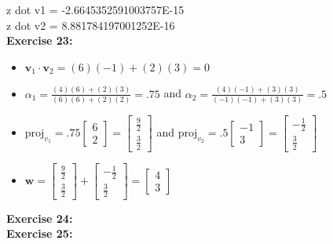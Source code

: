 \documentclass[10pt]{article}
\begin{document}
	z dot v1 = -2.6645352591003757E-15\\
	z dot v2 = 8.881784197001252E-16
	\\
	
	\textbf{\large Exercise 23:}\\
	\begin{itemize}
		\item $\textbf{v}_1 \cdot \textbf{v}_2 = (6)(-1) + (2)(3) = 0$	
		\item $\alpha_1 = \frac{(4)(6) + (2)(3)}{(6)(6) + (2)(2)} = .75$ and $\alpha_2 = \frac{(4)(-1) + (3)(3)}{(-1)(-1) + (3)(3)} = .5$
		\item $\text{proj}_{v_1} = .75 \begin{bmatrix}6\\2\end{bmatrix} = \begin{bmatrix}\frac{9}{2}\\\frac{3}{2}\end{bmatrix}$ and $\text{proj}_{v_2} = .5 \begin{bmatrix}-1\\3\end{bmatrix} = \begin{bmatrix}-\frac{1}{2}\\\frac{3}{2}\end{bmatrix}$
		\item $\textbf{w} = \begin{bmatrix}\frac{9}{2}\\\frac{3}{2}\end{bmatrix} + \begin{bmatrix}-\frac{1}{2}\\\frac{3}{2}\end{bmatrix} = \begin{bmatrix}4\\3\end{bmatrix}$
	\end{itemize}
	
	\textbf{\large Exercise 24:}\\
	
	\textbf{\large Exercise 25:}\\
	
\end{document}
